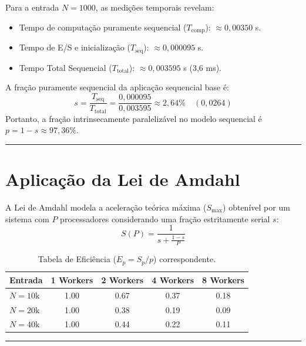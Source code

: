 \documentclass[12pt,a4paper]{article}
\begin{document}
Para a entrada $N = 1000$, as medições temporais revelam:
\begin{itemize}
    \item Tempo de computação puramente sequencial ($T_{\text{comp}}$): $\approx 0{,}00350$ s.
    \item Tempo de E/S e inicialização ($T_{\text{seq}}$): $\approx 0{,}000095$ s.
    \item Tempo Total Sequencial ($T_{\text{total}}$): $\approx 0{,}003595$ s (3,6 ms).
\end{itemize}

A fração puramente sequencial da aplicação sequencial base é:
\begin{equation}
s = \frac{T_{\text{seq}}}{T_{\text{total}}} = \frac{0{,}000095}{0{,}003595} \approx 2{,}64\% \quad (0{,}0264)
\end{equation}
Portanto, a fração intrinsecamente paralelizável no modelo sequencial é $p = 1 - s \approx 97{,}36\%$.

\vspace{0.5cm}
\hrule
\vspace{0.5cm}

\section{Aplicação da Lei de Amdahl}

A Lei de Amdahl modela a aceleração teórica máxima ($S_{\text{max}}$) obtenível por um sistema com $P$ processadores considerando uma fração estritamente serial $s$:
\begin{equation}
S(P) = \frac{1}{s + \frac{1 - s}{P}}
\end{equation}

\begin{table}[h!]
\centering
\caption{Tabela de Eficiência ($E_p = S_p / p$) correspondente.}
\label{tab:eficiencia}
\begin{tabular}{@{}lcccc@{}}
\toprule
\textbf{Entrada} & \textbf{1 Workers} & \textbf{2 Workers} & \textbf{4 Workers} & \textbf{8 Workers} \\ \midrule
$N = 10\text{k}$ & 1.00 & 0.67 & 0.37 & 0.18 \\
$N = 20\text{k}$ & 1.00 & 0.38 & 0.19 & 0.09 \\
$N = 40\text{k}$ & 1.00 & 0.44 & 0.22 & 0.11 \\
\bottomrule
\end{tabular}
\end{table}

\vspace{0.5cm}
\hrule
\vspace{0.5cm}
\end{document}
